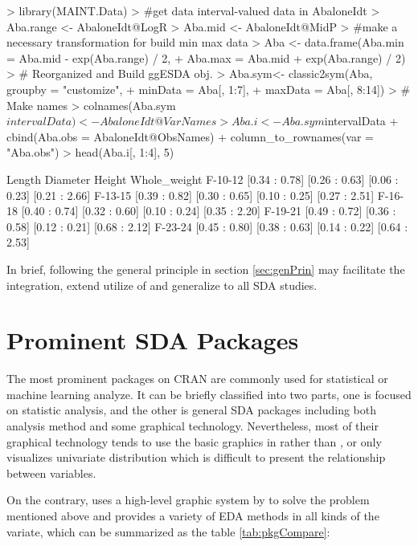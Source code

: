 \documentclass[article]{jss}
\begin{document}
\begin{Schunk}
\begin{Sinput}
> library(MAINT.Data)
> #get data interval-valued data in AbaloneIdt
> Aba.range <- AbaloneIdt@LogR
> Aba.mid <- AbaloneIdt@MidP
> #make a necessary transformation for build min max data
> Aba <- data.frame(Aba.min = Aba.mid - exp(Aba.range) / 2,
+                   Aba.max = Aba.mid + exp(Aba.range) / 2)
> # Reorganized and Build ggESDA obj.
> Aba.sym<- classic2sym(Aba, groupby = "customize",
+                       minData = Aba[, 1:7],
+                       maxData = Aba[, 8:14])
> # Make names
> colnames(Aba.sym$intervalData) <- AbaloneIdt@VarNames
> Aba.i <- Aba.sym$intervalData %
+   cbind(Aba.obs = AbaloneIdt@ObsNames) %
+   column_to_rownames(var = "Aba.obs")
> head(Aba.i[, 1:4], 5)
\end{Sinput}
\begin{Soutput}
               Length      Diameter        Height  Whole_weight
F-10-12 [0.34 : 0.78] [0.26 : 0.63] [0.06 : 0.23] [0.21 : 2.66]
F-13-15 [0.39 : 0.82] [0.30 : 0.65] [0.10 : 0.25] [0.27 : 2.51]
F-16-18 [0.40 : 0.74] [0.32 : 0.60] [0.10 : 0.24] [0.35 : 2.20]
F-19-21 [0.49 : 0.72] [0.36 : 0.58] [0.12 : 0.21] [0.68 : 2.12]
F-23-24 [0.45 : 0.80] [0.38 : 0.63] [0.14 : 0.22] [0.64 : 2.53]
\end{Soutput}
\end{Schunk}

In brief, following the general principle in section \ref{sec:genPrin} may facilitate the integration, extend utilize of  and generalize to all SDA studies.

\section{Prominent SDA Packages}

The most prominent packages on CRAN are commonly used for statistical or machine learning analyze. It can be briefly classified into two parts, one is focused on statistic analysis, and the other is general SDA packages including both analysis method and some graphical technology. Nevertheless, most of their graphical technology tends to use the basic graphics in  rather than , or only visualizes univariate distribution which is difficult to present the relationship between variables. 

On the contrary,  uses a high-level graphic system by  to solve the problem mentioned above and provides a variety of EDA methods in all kinds of the variate, which can be summarized as the table \ref{tab:pkgCompare}:
\end{document}
